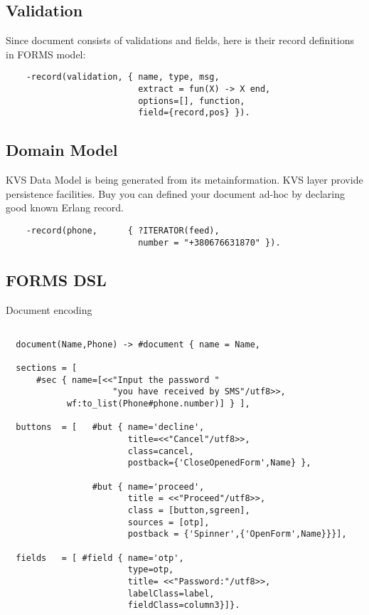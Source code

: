 \subsection{Validation}
Since document consists of validations and fields, here is their
record definitions in FORMS model:

\vspace{1\baselineskip}
\begin{lstlisting}
    -record(validation, { name, type, msg,
                          extract = fun(X) -> X end,
                          options=[], function,
                          field={record,pos} }).
\end{lstlisting}
\vspace{1\baselineskip}

\subsection{Domain Model}
KVS Data Model is being generated from its metainformation.
KVS layer provide persistence facilities. Buy you can defined
your document ad-hoc by declaring good known Erlang record.

\vspace{1\baselineskip}
\begin{lstlisting}
    -record(phone,      { ?ITERATOR(feed),
                          number = "+380676631870" }).
\end{lstlisting}


\newpage
\subsection{FORMS DSL}
Document encoding

\vspace{1\baselineskip}
\begin{lstlisting}

  document(Name,Phone) -> #document { name = Name,

  sections = [
      #sec { name=[<<"Input the password "
                     "you have received by SMS"/utf8>>,
            wf:to_list(Phone#phone.number)] } ],

  buttons  = [   #but { name='decline',
                        title=<<"Cancel"/utf8>>,
                        class=cancel,
                        postback={'CloseOpenedForm',Name} },

                 #but { name='proceed',
                        title = <<"Proceed"/utf8>>,
                        class = [button,sgreen],
                        sources = [otp],
                        postback = {'Spinner',{'OpenForm',Name}}}],

  fields   = [ #field { name='otp',
                        type=otp,
                        title= <<"Password:"/utf8>>,
                        labelClass=label,
                        fieldClass=column3}]}.
\end{lstlisting}


